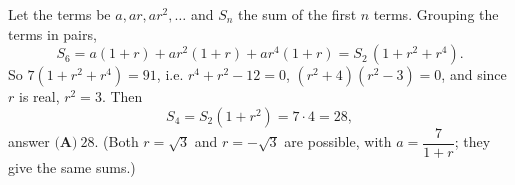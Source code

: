 Let the terms be $a,ar,ar^2,\ldots$ and $S_n$ the sum of the first $n$ terms. Grouping the terms in pairs,
\[S_6=a(1+r)+ar^2(1+r)+ar^4(1+r)=S_2\,(1+r^2+r^4).\]
So $7(1+r^2+r^4)=91$, i.e. $r^4+r^2-12=0$, $(r^2+4)(r^2-3)=0$, and since $r$ is real, $r^2=3$. Then
\[S_4=S_2(1+r^2)=7\cdot4=28,\]
answer $\boxed{\textbf{(A)}\ 28}$. (Both $r=\sqrt3$ and $r=-\sqrt3$ are possible, with $a=\dfrac{7}{1+r}$; they give the same sums.)
